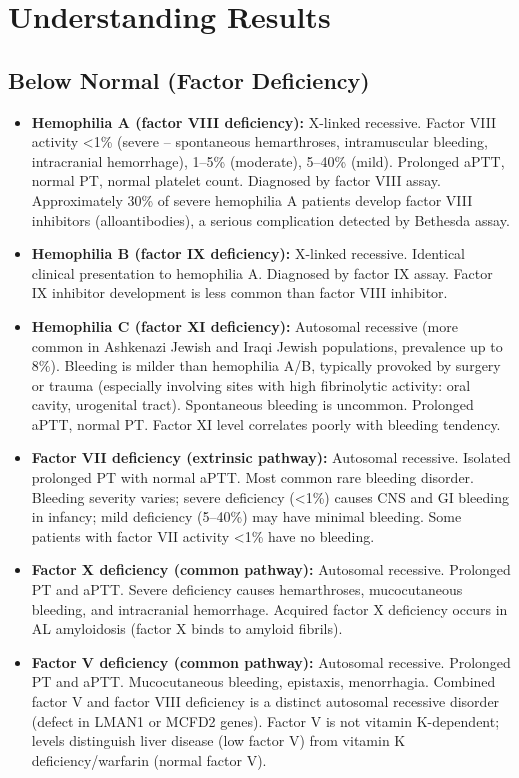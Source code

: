 \section*{Understanding Results}

\subsection*{Below Normal (Factor Deficiency)}
\begin{itemize}
  \item \textbf{Hemophilia A (factor VIII deficiency):} X-linked recessive. Factor VIII activity <1\% (severe -- spontaneous hemarthroses, intramuscular bleeding, intracranial hemorrhage), 1--5\% (moderate), 5--40\% (mild). Prolonged aPTT, normal PT, normal platelet count. Diagnosed by factor VIII assay. Approximately 30\% of severe hemophilia A patients develop factor VIII inhibitors (alloantibodies), a serious complication detected by Bethesda assay.
  \item \textbf{Hemophilia B (factor IX deficiency):} X-linked recessive. Identical clinical presentation to hemophilia A. Diagnosed by factor IX assay. Factor IX inhibitor development is less common than factor VIII inhibitor.
  \item \textbf{Hemophilia C (factor XI deficiency):} Autosomal recessive (more common in Ashkenazi Jewish and Iraqi Jewish populations, prevalence up to 8\%). Bleeding is milder than hemophilia A/B, typically provoked by surgery or trauma (especially involving sites with high fibrinolytic activity: oral cavity, urogenital tract). Spontaneous bleeding is uncommon. Prolonged aPTT, normal PT. Factor XI level correlates poorly with bleeding tendency.
  \item \textbf{Factor VII deficiency (extrinsic pathway):} Autosomal recessive. Isolated prolonged PT with normal aPTT. Most common rare bleeding disorder. Bleeding severity varies; severe deficiency (<1\%) causes CNS and GI bleeding in infancy; mild deficiency (5--40\%) may have minimal bleeding. Some patients with factor VII activity <1\% have no bleeding.
  \item \textbf{Factor X deficiency (common pathway):} Autosomal recessive. Prolonged PT and aPTT. Severe deficiency causes hemarthroses, mucocutaneous bleeding, and intracranial hemorrhage. Acquired factor X deficiency occurs in AL amyloidosis (factor X binds to amyloid fibrils).
  \item \textbf{Factor V deficiency (common pathway):} Autosomal recessive. Prolonged PT and aPTT. Mucocutaneous bleeding, epistaxis, menorrhagia. Combined factor V and factor VIII deficiency is a distinct autosomal recessive disorder (defect in LMAN1 or MCFD2 genes). Factor V is not vitamin K-dependent; levels distinguish liver disease (low factor V) from vitamin K deficiency/warfarin (normal factor V).

\end{itemize}

